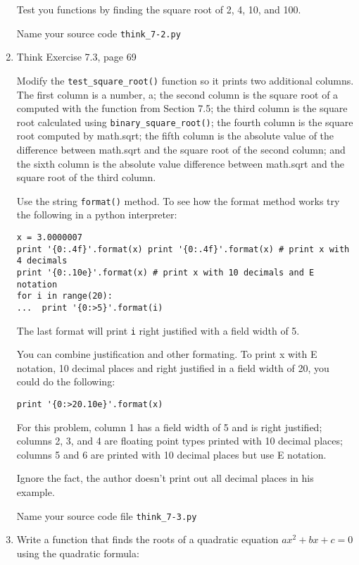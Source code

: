 \documentclass[12pt]{article}
\begin{document}
\begin{enumerate}
Test you functions by finding the square root of 2, 4, 10, and 100.

Name your source code \texttt{think\_7-2.py}

\item Think Exercise 7.3, page 69

  Modify the \texttt{test\_square\_root()} function so it prints two additional columns. The first column is a number, a; the second column is the square root of a computed with the function
  from Section 7.5; the third column is the square root calculated using \texttt{binary\_square\_root()}; the fourth column is the square root computed by math.sqrt; the fifth column is
the absolute value of the difference between math.sqrt and the square root of the second column; and the sixth column is the absolute value difference between math.sqrt and the square root of the third column.

Use the string \texttt{format()} method. To see how the format method works try the following in a python interpreter:

\begin{verbatim}
x = 3.0000007
print '{0:.4f}'.format(x) print '{0:.4f}'.format(x) # print x with 4 decimals
print '{0:.10e}'.format(x) # print x with 10 decimals and E notation
for i in range(20):
...  print '{0:>5}'.format(i)

\end{verbatim}

The last format will print \texttt{i} right justified with a field width of 5. 

You can combine justification and other formating. To print x with E notation, 10 decimal places and right justified in a field width of 20, you could do the following:

\begin{verbatim}
print '{0:>20.10e}'.format(x)
\end{verbatim}

For this problem, column 1 has a field width of 5 and is right justified; columns 2, 3, and 4 are floating point types printed with 10 decimal places; columns 5 and 6 are printed with 10 decimal places but use E notation.

Ignore the fact, the author doesn't print out all decimal places in his example.

Name your source code file \texttt{think\_7-3.py}

\item Write a function that finds the roots of a quadratic equation $ax^2 + bx + c = 0$ using the quadratic formula: 


\end{enumerate}
\end{document}
